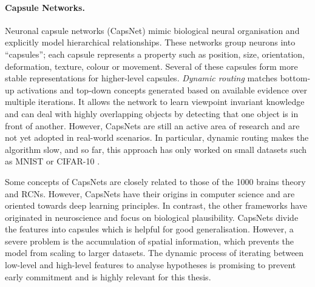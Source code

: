 \paragraph{Capsule Networks.} Neuronal capsule networks (CapsNet)  mimic biological neural organisation and explicitly model hierarchical relationships. These networks group neurons into ``capsules''; each capsule represents a property such as position, size, orientation, deformation, texture, colour or movement. Several of these capsules form more stable representations for higher-level capsules. \emph{Dynamic routing}  matches bottom-up activations and top-down concepts generated based on available evidence over multiple iterations. It allows the network to learn viewpoint invariant knowledge and can deal with highly overlapping objects by detecting that one object is in front of another. However, CapsNets are still an active area of research and are not yet adopted in real-world scenarios. In particular, dynamic routing makes the algorithm slow, and so far, this approach has only worked on small datasets such as MNIST  or CIFAR-10 .

Some concepts of CapsNets are closely related to those of the 1000 brains theory and RCNs. However, CapsNets have their origins in computer science and are oriented towards deep learning principles. In contrast, the other frameworks have originated in neuroscience and focus on biological plausibility. CapsNets divide the features into capsules which is helpful for good generalisation. However, a severe problem is the accumulation of spatial information, which prevents the model from scaling to larger datasets.
The dynamic process of iterating between low-level and high-level features to analyse hypotheses is promising to prevent early commitment  and is highly relevant for this thesis.


